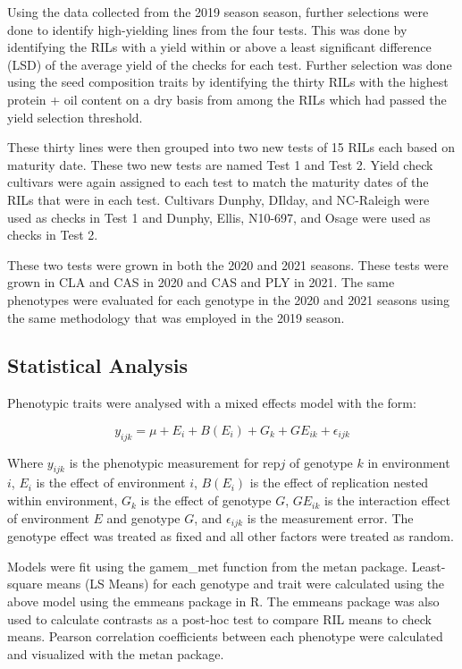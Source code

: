 \documentclass[Agronomy,article,submit,moreauthors,pdftex]{mdpi}
\begin{document}
Using the data collected from the 2019 season season, further selections
were done to identify high-yielding lines from the four tests. This was
done by identifying the RILs with a yield within or above a least
significant difference (LSD) of the average yield of the checks for each
test. Further selection was done using the seed composition traits by
identifying the thirty RILs with the highest protein + oil content on a
dry basis from among the RILs which had passed the yield selection
threshold.

These thirty lines were then grouped into two new tests of 15 RILs each
based on maturity date. These two new tests are named Test 1 and Test 2.
Yield check cultivars were again assigned to each test to match the
maturity dates of the RILs that were in each test. Cultivars Dunphy,
DIlday, and NC-Raleigh were used as checks in Test 1 and Dunphy, Ellis,
N10-697, and Osage were used as checks in Test 2.

These two tests were grown in both the 2020 and 2021 seasons. These
tests were grown in CLA and CAS in 2020 and CAS and PLY in 2021. The
same phenotypes were evaluated for each genotype in the 2020 and 2021
seasons using the same methodology that was employed in the 2019 season.

\hypertarget{statistical-analysis}{%
\subsection{Statistical Analysis}\label{statistical-analysis}}

Phenotypic traits were analysed with a mixed effects model with the
form:

\[y_{ijk} = \mu + E_i + B(E_i) + G_k + GE_{ik} + \epsilon_{ijk}\]

Where \(y_{ijk}\) is the phenotypic measurement for rep\(j\) of genotype
\(k\) in environment \(i\), \(E_i\) is the effect of environment \(i\),
\(B(E_i)\) is the effect of replication nested within environment,
\(G_k\) is the effect of genotype \(G\), \(GE_{ik}\) is the interaction
effect of environment \(E\) and genotype \(G\), and \(\epsilon_{ijk}\)
is the measurement error. The genotype effect was treated as fixed and
all other factors were treated as random.

Models were fit using the gamem\_met function from the metan
package\citep{olivotoMetanPackageMultienvironment2020}. Least-square
means (LS Means) for each genotype and trait were calculated using the
above model using the emmeans
package\citep{lenthEmmeansEstimatedMarginal2022} in R. The emmeans
package was also used to calculate contrasts as a post-hoc test to
compare RIL means to check means. Pearson correlation coefficients
between each phenotype were calculated and visualized with the metan
package.
\end{document}
